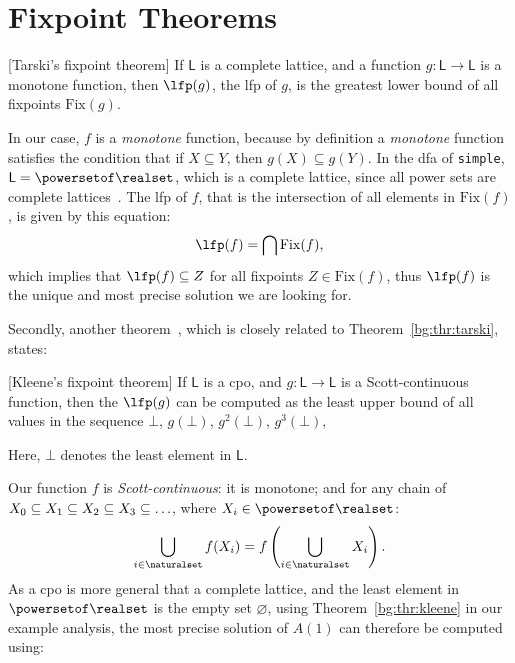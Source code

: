 \section{Fixpoint Theorems}

\begin{theorem}
    \textup{[Tarski's fixpoint theorem]}
    If $\mathsf{L}$ is a complete lattice\footnotemark[2], and a function
    $g: \mathsf{L} \to \mathsf{L}$ is a monotone function, then $\lfp(g)$,
    the \gls{lfp} of $g$, is the greatest lower bound of all fixpoints
    $\mathrm{Fix}(g)$.\label{bg:thr:tarski}
\end{theorem}

In our case, $f$ is a \emph{monotone} function, because by definition a
\emph{monotone} function satisfies the condition that if $X \subseteq Y$,
then $g(X) \subseteq g(Y)$.  In the \gls{dfa} of \verb|simple|, $\mathsf{L}
= \powersetof\realset$, which is a complete lattice, since all power sets
are complete lattices~\cite{nielson99}.  The \gls{lfp} of $f$, that is the
intersection of all elements in $\mathrm{Fix}(f)$, is given by this equation:
\begin{equation}
    \lfp (f) = \bigcap \mathrm{Fix}(f),
\end{equation}
which implies that $\lfp (f) \subseteq Z$ for all fixpoints $Z \in
\mathrm{Fix}(f)$, thus $\lfp (f)$ is the unique and most precise solution we
are looking for.

Secondly, another theorem~\cite{kleene52}, which is closely
related to Theorem~\ref{bg:thr:tarski}, states:
\begin{theorem}
    \textup{[Kleene's fixpoint theorem]}
    If $\mathsf{L}$ is a \gls{cpo}\footnotemark[2], and $g: \mathsf{L} \to
    \mathsf{L}$ is a Scott-continuous function, then the $\lfp (g)$ can be
    computed as the least upper bound of all values in the sequence $\bot$,
    $g(\bot)$, $g^2(\bot)$, $g^3(\bot)$, \textellipsis{}\label{bg:thr:kleene}
\end{theorem}
Here, $\bot$ denotes the least element in $\mathsf{L}$.  

Our function $f$ is \emph{Scott-continuous}: it is monotone; and for any chain
of $X_0 \subseteq X_1 \subseteq X_2 \subseteq X_3 \subseteq \mathellipsis$,
where $X_i \in \powersetof\realset$:
\begin{equation}
    \bigcup_{i \in \naturalset} f(X_i) = f \left(
        \bigcup_{i \in \naturalset} X_i
    \right).
\end{equation}
As a \gls{cpo} is more general that a complete lattice, and the least
element in $\powersetof\realset$ is the empty set $\varnothing$, using
Theorem~\ref{bg:thr:kleene} in our example analysis, the most precise solution
of $A(1)$ can therefore be computed using:


